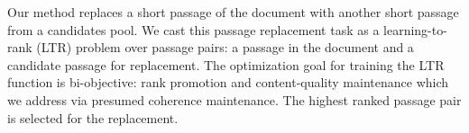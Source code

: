 Our method replaces a short passage of the
document with another short passage from a candidates pool.
We cast this passage replacement task as a learning-to-rank (LTR) \cite{Liu:11a} problem over passage pairs:
a passage in the document and a
candidate passage for replacement. The optimization goal for
training the LTR function is bi-objective: rank promotion and
content-quality maintenance which we address via presumed coherence maintenance.
The highest
ranked passage pair is selected for the replacement.










